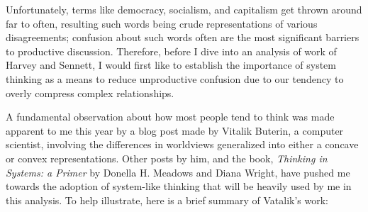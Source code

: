 \documentclass[12pt,a4paper]{article}
\begin{document}
Unfortunately, terms like democracy, socialism, and capitalism get thrown around far to often, resulting such words being crude representations of various disagreements; confusion about such words often are the most significant barriers to productive discussion. Therefore, before I dive into an analysis of work of Harvey and Sennett, I would first like to establish the importance of system thinking as a means to reduce unproductive confusion due to our tendency to overly compress complex relationships. 

A fundamental observation about how most people tend to think was made apparent to me this year by a blog post made by Vitalik Buterin, a computer scientist, involving the differences in worldviews generalized into either a concave or convex representations. Other posts by him, and the book, \textit{Thinking in Systems: a Primer} by Donella H. Meadows and Diana Wright, have pushed me towards the adoption of system-like thinking that will be heavily used by me in this analysis. To help illustrate, here is a brief summary of Vatalik's work:
\end{document}
